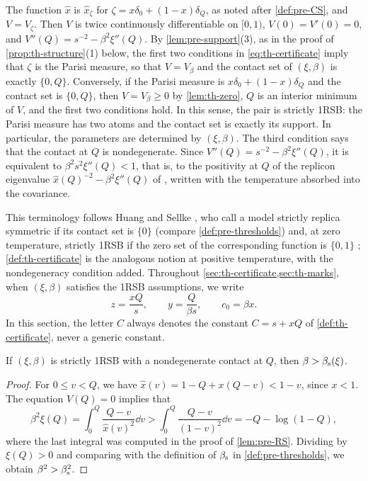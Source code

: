 The function $\hat x$ is $\hat x_\zeta$ for $\zeta=x\delta_0+(1-x)\delta_Q$, as noted after \cref{def:pre-CS}, and $V=V_\zeta$. Then $V$ is twice continuously differentiable on $[0,1)$, $V(0)=V'(0)=0$, and $V''(Q)=s^{-2}-\beta^2\xi''(Q)$. By \cref{lem:pre-support}(3), as in the proof of \cref{prop:th-structure}(1) below, the first two conditions in \eqref{eq:th-certificate} imply that $\zeta$ is the Parisi measure, so that $V=V_\beta$ and the contact set of $(\xi,\beta)$ is exactly $\{0,Q\}$. Conversely, if the Parisi measure is $x\delta_0+(1-x)\delta_Q$ and the contact set is $\{0,Q\}$, then $V=V_\beta\ge0$ by \cref{lem:th-zero}, $Q$ is an interior minimum of $V$, and the first two conditions hold. In this sense, the pair is strictly 1RSB: the Parisi measure has two atoms and the contact set is exactly its support. In particular, the parameters are determined by $(\xi,\beta)$. The third condition says that the contact at $Q$ is nondegenerate. Since $V''(Q)=s^{-2}-\beta^2\xi''(Q)$, it is equivalent to $\beta^2s^2\xi''(Q)<1$, that is, to the positivity at $Q$ of the replicon eigenvalue $\hat x(Q)^{-2}-\beta^2\xi''(Q)$ of \cite[Section~1.3]{BenArousJagannath2018}, written with the temperature absorbed into the covariance.

This terminology follows Huang and Sellke \cite{HuangSellke2024}, who call a model strictly replica symmetric if its contact set is $\{0\}$ \cite[Definition~3]{HuangSellke2024} (compare \cref{def:pre-thresholds}) and, at zero temperature, strictly 1RSB if the zero set of the corresponding function is $\{0,1\}$ \cite[Definition~4]{HuangSellke2024}; \cref{def:th-certificate} is the analogous notion at positive temperature, with the nondegeneracy condition added.
Throughout \cref{sec:th-certificate,sec:th-marks}, when $(\xi,\beta)$ satisfies the 1RSB assumptions, we write
\begin{equation}\label{eq:th-zy}
z=\frac{xQ}s,\qquad y=\frac Q{\beta s},\qquad c_0=\beta x.
\end{equation}
In this section, the letter $C$ always denotes the constant $C=s+xQ$ of \cref{def:th-certificate}, never a generic constant.

\begin{lemma}\label{lem:th-superstatic}
If $(\xi,\beta)$ is strictly 1RSB with a nondegenerate contact at $Q$, then $\beta>\beta_{\mathrm s}(\xi)$.
\end{lemma}

\begin{proof}
For $0\le v<Q$, we have $\hat x(v)=1-Q+x(Q-v)<1-v$, since $x<1$. The equation $V(Q)=0$ implies that
\[
\beta^2\xi(Q)=\int_0^Q\frac{Q-v}{\hat x(v)^2}\dd v>\int_0^Q\frac{Q-v}{(1-v)^2}\dd v=-Q-\log(1-Q),
\]
where the last integral was computed in the proof of \cref{lem:pre-RS}. Dividing by $\xi(Q)>0$ and comparing with the definition of $\beta_{\mathrm s}$ in \cref{def:pre-thresholds}, we obtain $\beta^2>\beta_{\mathrm s}^2$.
\end{proof}


